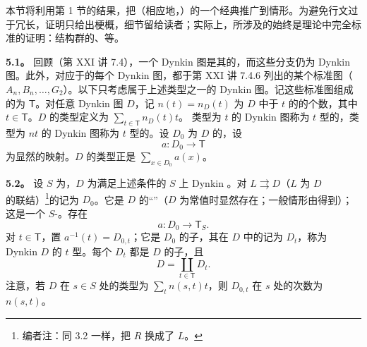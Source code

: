 本节将利用第 1 节的结果，把（相应地，）的一个经典推广到情形。为避免行文过于冗长，证明只给出梗概，细节留给读者；实际上，所涉及的始终是理论中完全标准的证明：结构群的、等。

\textbf{5.1。} 回顾（第 XXI 讲 7.4），一个 Dynkin 图是其的，而这些分支仍为 Dynkin 图。此外，对应于的每个 Dynkin 图，都于第 XXI 讲 7.4.6 列出的某个标准图（$A_n,B_n,\ldots,G_2$）。以下只考虑属于上述类型之一的 Dynkin 图。记这些标准图组成的为 $\mathsf T$。对任意 Dynkin 图 $D$，记 $n(t)=n_D(t)$ 为 $D$ 中于 $t$ 的的个数，其中 $t\in\mathsf T$。$D$ 的类型定义为 $\sum_{t\in\mathsf T}n_D(t)t$。
类型为 $t$ 的 Dynkin 图称为 $t$ 型的，类型为 $nt$ 的 Dynkin 图称为 $t$ 型的。设 $D_0$ 为 $D$ 的，设
\[a:D_0\longrightarrow\mathsf T\]
为显然的映射。$D$ 的类型正是 $\sum_{x\in D_0}a(x)$。

\textbf{5.2。} 设 $S$ 为，$D$ 为满足上述条件的 $S$ 上 Dynkin 。对 $L\rightrightarrows D$（$L$ 为 $D$ 的联结）\footnote{编者注：同 3.2 一样，把 $R$ 换成了 $L$。}的记为 $D_0$。它是 $D$ 的“”（$D$ 为常值时显然存在；一般情形由得到）；这是一个 $S$-。存在
\[a:D_0\longrightarrow\mathsf T_S.\]
对 $t\in\mathsf T$，置 $a^{-1}(t)=D_{0,t}$；它是 $D_0$ 的子，其在 $D$ 中的记为 $D_t$，称为 Dynkin  $D$ 的 $t$ 型。每个 $D_t$ 都是 $D$ 的子，且
\[D=\coprod_{t\in\mathsf T}D_t.\]
注意，若 $D$ 在 $s\in S$ 处的类型为 $\sum_t n(s,t)t$，则 $D_{0,t}$ 在 $s$ 处的次数为 $n(s,t)$。

